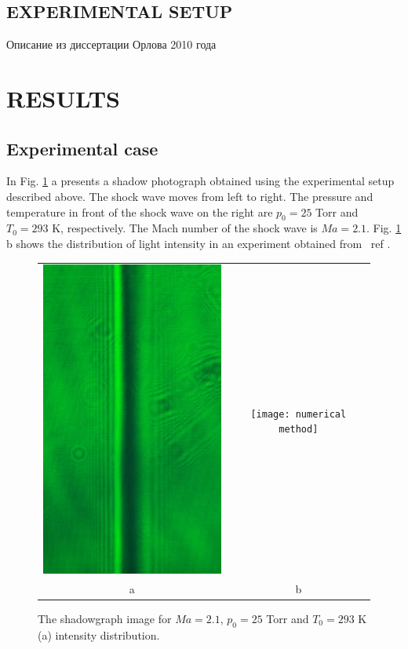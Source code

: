 \documentclass{aip-cp}
\begin{document}
\subsection{EXPERIMENTAL SETUP}

Описание из диссертации Орлова 2010 года

\section{RESULTS}

\subsection{Experimental case}

In Fig. \ref{Experiment_Ma2p1} a presents a shadow photograph obtained using the experimental setup described above. The shock wave moves from left to right. The pressure and temperature in front of the shock wave on the right are $p_0=25$ Torr and $T_0=293$ K, respectively. The Mach number of the shock wave is $Ma=2.1$. Fig. \ref{Experiment_Ma2p1} b shows the distribution of light intensity in an experiment obtained from \ ref {}.

\begin{figure}
\begin{tabular}{cc}
    {\includegraphics[width=185pt]{figures/Experiment_Ma2p1.jpg}}
    &{\texttt{[image:  numerical method]}}\\ a&b
\end{tabular}
\caption{The shadowgraph image for $Ma=2.1$, $p_0=25$ Torr and $T_0=293$ K (a) intensity distribution.}
\label{Experiment_Ma2p1}
\end{figure}
\end{document}
